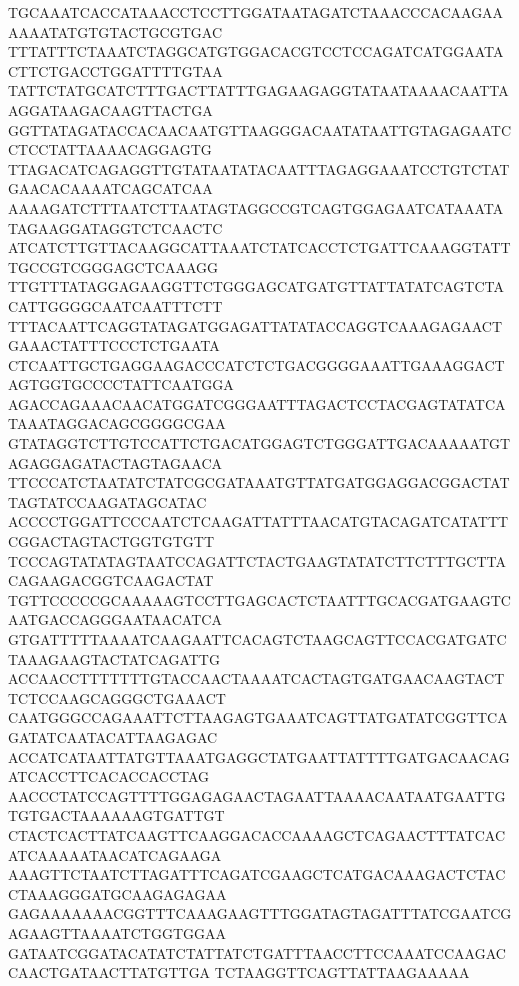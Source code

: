 TGCAAATCACCATAAACCTCCTTGGATAATAGATCTAAACCCACAAGAAAAAATATGTGTACTGCGTGAC
TTTATTTCTAAATCTAGGCATGTGGACACGTCCTCCAGATCATGGAATACTTCTGACCTGGATTTTGTAA
TATTCTATGCATCTTTGACTTATTTGAGAAGAGGTATAATAAAACAATTAAGGATAAGACAAGTTACTGA
GGTTATAGATACCACAACAATGTTAAGGGACAATATAATTGTAGAGAATCCTCCTATTAAAACAGGAGTG
TTAGACATCAGAGGTTGTATAATATACAATTTAGAGGAAATCCTGTCTATGAACACAAAATCAGCATCAA
AAAAGATCTTTAATCTTAATAGTAGGCCGTCAGTGGAGAATCATAAATATAGAAGGATAGGTCTCAACTC
ATCATCTTGTTACAAGGCATTAAATCTATCACCTCTGATTCAAAGGTATTTGCCGTCGGGAGCTCAAAGG
TTGTTTATAGGAGAAGGTTCTGGGAGCATGATGTTATTATATCAGTCTACATTGGGGCAATCAATTTCTT
TTTACAATTCAGGTATAGATGGAGATTATATACCAGGTCAAAGAGAACTGAAACTATTTCCCTCTGAATA
CTCAATTGCTGAGGAAGACCCATCTCTGACGGGGAAATTGAAAGGACTAGTGGTGCCCCTATTCAATGGA
AGACCAGAAACAACATGGATCGGGAATTTAGACTCCTACGAGTATATCATAAATAGGACAGCGGGGCGAA
GTATAGGTCTTGTCCATTCTGACATGGAGTCTGGGATTGACAAAAATGTAGAGGAGATACTAGTAGAACA
TTCCCATCTAATATCTATCGCGATAAATGTTATGATGGAGGACGGACTATTAGTATCCAAGATAGCATAC
ACCCCTGGATTCCCAATCTCAAGATTATTTAACATGTACAGATCATATTTCGGACTAGTACTGGTGTGTT
TCCCAGTATATAGTAATCCAGATTCTACTGAAGTATATCTTCTTTGCTTACAGAAGACGGTCAAGACTAT
TGTTCCCCCGCAAAAAGTCCTTGAGCACTCTAATTTGCACGATGAAGTCAATGACCAGGGAATAACATCA
GTGATTTTTAAAATCAAGAATTCACAGTCTAAGCAGTTCCACGATGATCTAAAGAAGTACTATCAGATTG
ACCAACCTTTTTTTGTACCAACTAAAATCACTAGTGATGAACAAGTACTTCTCCAAGCAGGGCTGAAACT
CAATGGGCCAGAAATTCTTAAGAGTGAAATCAGTTATGATATCGGTTCAGATATCAATACATTAAGAGAC
ACCATCATAATTATGTTAAATGAGGCTATGAATTATTTTGATGACAACAGATCACCTTCACACCACCTAG
AACCCTATCCAGTTTTGGAGAGAACTAGAATTAAAACAATAATGAATTGTGTGACTAAAAAAGTGATTGT
CTACTCACTTATCAAGTTCAAGGACACCAAAAGCTCAGAACTTTATCACATCAAAAATAACATCAGAAGA
AAAGTTCTAATCTTAGATTTCAGATCGAAGCTCATGACAAAGACTCTACCTAAAGGGATGCAAGAGAGAA
GAGAAAAAAACGGTTTCAAAGAAGTTTGGATAGTAGATTTATCGAATCGAGAAGTTAAAATCTGGTGGAA
GATAATCGGATACATATCTATTATCTGATTTAACCTTCCAAATCCAAGACCAACTGATAACTTATGTTGA
TCTAAGGTTCAGTTATTAAGAAAAA


